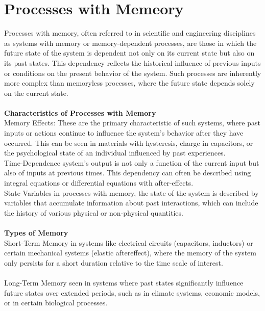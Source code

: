 \documentclass[12pt]{article}
\begin{document}
\section{Processes with Memeory}
%
Processes with memory, often referred to in scientific and engineering
disciplines as systems with memory or memory-dependent processes, are
those in which the future state of the system is dependent not only on
its current state but also on its past states. This dependency reflects
the historical influence of previous inputs or conditions on the present
behavior of the system. Such processes are inherently more complex than
memoryless processes, where the future state depends solely on the
current state.\\
\\
\textbf{Characteristics of Processes with Memory}\\
Memory Effects: These are the primary characteristic of such systems, where
past inputs or actions continue to influence the system’s behavior after
they have occurred. This can be seen in materials with hysteresis, charge
in capacitors, or the psychological state of an individual influenced by
past experiences.\\
Time-Dependence system’s output is not only a function of the current 
input but also of inputs at previous times. This dependency can often be
described using integral equations or differential equations with
after-effects.\\
State Variables in processes with memory, the state of the system is 
described by variables that accumulate information about past
interactions, which can include the history of various physical or
non-physical quantities.\\
\\
\textbf{Types of Memory}\\
Short-Term Memory in systems like electrical circuits (capacitors,
inductors) or certain mechanical systems (elastic aftereffect), where
the memory of the system only persists for a short duration relative
to the time scale of interest.\\
\\
Long-Term Memory seen in systems where past states significantly
influence future states over extended periods, such as in climate
systems, economic models, or in certain biological processes.
%
\end{document}
